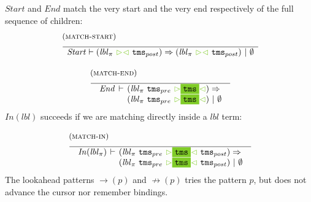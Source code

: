 \documentclass{article}
\makeatletter
\newcommand{\rulename}{\textsc}
\newcommand{\irule}[3]{\begin{array}{l}{~\small\mbox{(\rulename{#1})}}\\\;\frac{\begin{array}{c}#2\end{array}}{\begin{array}{l}#3\end{array}}\end{array}}
\newcommand{\cursorColor}{LimeGreen}
\newcommand{\lbl}{\ensuremath{\mathit{lbl}}}
\newcommand{\tms}{\ensuremath{\mathtt{tms}}}
\newcommand{\mstart}{\ensuremath{\textcolor{\cursorColor}{\rhd}}}
\newcommand{\mend}{\ensuremath{\textcolor{\cursorColor}{\lhd}}}
\newcommand{\nobindings}{\ensuremath{\emptyset}}
\newcommand{\select}[1]{\mstart\colorbox{\cursorColor}{$#1$}\mend}
\newcommand{\matches}[4]{\ensuremath{#1 \vdash #2 \Rightarrow #3 ~|~ #4}}
\newcommand{\xmatches}[4]{\ensuremath{
    \begin{array}{r@{\hspace{4pt}}c@{\hspace{4pt}}l}%
      #1 & \vdash & #2 \Rightarrow\\
         &        & #3 ~|~ #4
    \end{array}}}
\newcommand{\pseq}[2]{\ensuremath{#1 \cdot #2}}
\newcommand{\por}[2]{\ensuremath{#1/#2}}
\newcommand{\children}[2]{\ensuremath{#1} \Downarrow #2}
\newcommand{\pnot}[1]{\ensuremath{\lnot #1}}
\newcommand{\maybe}[1]{\ensuremath{#1?}}
\newcommand{\many}[1]{\ensuremath{#1^*}}
\newcommand{\bind}[2]{\ensuremath{#1@#2}}
\newcommand{\fb}[1]{\ensuremath{\mathop{\rightarrow}(#1)}}
\newcommand{\nfb}[1]{\ensuremath{\mathop{\not\rightarrow}(#1)}}
\newcommand{\pin}[1]{\ensuremath{\mathit{In}(#1)}}
\newcommand{\pstart}{\ensuremath{\mathit{Start}}}
\newcommand{\pend}{\ensuremath{\mathit{End}}}
\makeatother
\begin{document}
%
%
%
\pstart{} and \pend{} match the very start and the very end
respectively of the full sequence of children:
%
\[
  \begin{array}{c}
    \irule{match-start}{}{
    \matches{\pstart}
    {(\lbl_\pi~\mstart\mend~\tms_{post})}
    {(\lbl_\pi~\mstart\mend~\tms_{post})}{\nobindings}
    }
    \\\\
    \irule{match-end}{}{
    \xmatches{\pend}
    {(\lbl_\pi~\tms_{pre}~\select{\tms})}
    {(\lbl_\pi~\tms_{pre}~\select{\tms})}{\nobindings}
    }
  \end{array}
\]
%
$\pin{\lbl}$ succeeds if we are matching directly inside a $\lbl$
term:

\[
  \begin{array}{c}
    \irule{match-in}{}{
    \xmatches{\pin{\lbl_\pi}}
    {(\lbl_\pi~\tms_{pre}~\select{\tms}~\tms_{post})}
    {(\lbl_\pi~\tms_{pre}~\select{\tms}~\tms_{post})}{\nobindings}
    }
  \end{array}
\]
%
The lookahead patterns $\fb{p}$ and $\nfb{p}$ tries the pattern
$p$, but does not advance the cursor nor remember bindings.
\end{document}
